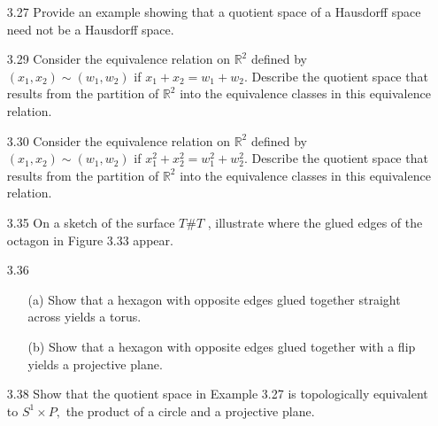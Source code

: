 \documentclass[12pt]{article}
\begin{document}
\begin{enumerate}
	\item[3.27] Provide an example showing that a quotient space of a Hausdorff space need
	not be a Hausdorff space.

	\item[3.29] Consider the equivalence relation on $\mathbb { R } ^ { 2 }$ defined by $\left( x _ { 1 } , x _ { 2 } \right) \sim \left( w _ { 1 } , w _ { 2 } \right)$ if $x _ { 1 } + x _ { 2 } = w _ { 1 } + w _ { 2 } .$ Describe the quotient space that results from the partition of $\mathbb { R } ^ { 2 }$ into the equivalence classes in this equivalence relation.

	\item[3.30] Consider the equivalence relation on $\mathbb { R } ^ { 2 }$ defined by $\left( x _ { 1 } , x _ { 2 } \right) \sim \left( w _ { 1 } , w _ { 2 } \right)$ if $x _ { 1 } ^ { 2 } + x _ { 2 } ^ { 2 } = w _ { 1 } ^ { 2 } + w _ { 2 } ^ { 2 } .$ Describe the quotient space that results from the partition of $\mathbb { R } ^ { 2 }$ into the equivalence classes in this equivalence relation.

	\item[3.35] On a sketch of the surface $T \# T$ , illustrate where the glued edges of the octagon in Figure 3.33 appear.

	\item[3.36] \begin{enumerate}
		\item[(a)] Show that a hexagon with opposite edges glued together straight across yields a torus.
			
		\item[(b)]Show that a hexagon with opposite edges glued together with a flip yields	a projective plane.
		
	\end{enumerate}
	
	\item[3.38] Show that the quotient space in Example 3.27 is topologically equivalent to
	$S ^ { 1 } \times P ,$ the product of a circle and a projective plane.

\end{enumerate}
 
\end{document}
